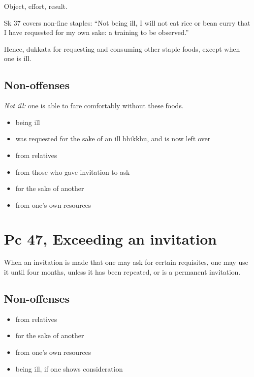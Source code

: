 Object, effort, result.

Sk 37 covers non-fine staples: ``Not being ill, I will not eat rice or
bean curry that I have requested for my own sake: a training to be
observed.''

Hence, dukkata for requesting and consuming other staple foods, except
when one is ill.

\subsection{Non-offenses}

\emph{Not ill:} one is able to fare comfortably without these foods.

\begin{multicols}{2}

\begin{itemize}
\tightlist
\item
  being ill
\item
  was requested for the sake of an ill bhikkhu, and is now left over
\item
  from relatives
\item
  from those who gave invitation to ask
\item
  for the sake of another
\item
  from one's own resources
\end{itemize}

\end{multicols}

\section{Pc 47, Exceeding an invitation}

When an invitation is made that one may ask for certain requisites, one
may use it until four months, unless it has been repeated, or is a
permanent invitation.

\subsection{Non-offenses}

\begin{multicols}{2}

\begin{itemize}
\tightlist
\item
  from relatives
\item
  for the sake of another
\item
  from one's own resources
\item
  being ill, if one shows consideration
\end{itemize}

\end{multicols}

